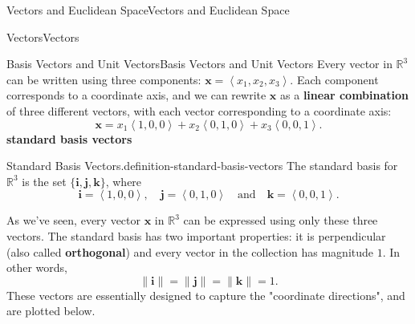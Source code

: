 \documentclass[10pt,]{book}
\newcommand{\terminology}[1]{\textbf{#1}}
\numberwithin{equation}{section}
\newcommand{\RR}{\mathbb{R}}
\newcommand{\vv}[1]{\mathbf{#1}}
\newcommand{\dotprod}[1]{\left\langle #1 \right\rangle}
\begin{document}
\begin{chapterptx}{Vectors and Euclidean Space}{}{Vectors and Euclidean Space}{}{}
\begin{sectionptx}{Vectors}{}{Vectors}{}{}
\begin{subsectionptx}{Basis Vectors and Unit Vectors}{}{Basis Vectors and Unit Vectors}{}{}
\hypertarget{p-890}{}%
Every vector in \(\RR^{3}\) can be written using three components: \(\vv{x} = \dotprod{x_{1},x_{2},x_{3}}.\) Each component corresponds to a coordinate axis, and we can rewrite \(\vv{x}\) as a \terminology{linear combination} of three different vectors, with each vector corresponding to a coordinate axis:%
%
\begin{equation*}
\vv{x} = x_{1}\dotprod{1,0,0}+x_{2}\dotprod{0,1,0}+x_{3}\dotprod{0,0,1}.
\end{equation*}
\terminology{standard basis vectors}\begin{definition}{Standard Basis Vectors.}{definition-standard-basis-vectors}%
\hypertarget{p-891}{}%
The standard basis for \(\RR^{3}\) is the set \(\{\vv{i},\vv{j},\vv{k}\}\), where%
%
\begin{equation*}
\vv{i} = \dotprod{1,0,0},\quad\vv{j} = \dotprod{0,1,0}\quad\text{and}\quad\vv{k} = \dotprod{0,0,1}.
\end{equation*}
\end{definition}
\hypertarget{p-892}{}%
As we've seen, every vector \(\vv{x}\) in \(\RR^{3}\) can be expressed using only these three vectors. The standard basis has two important properties: it is perpendicular (also called \terminology{orthogonal}) and every vector in the collection has magnitude \(1\). In other words,%
%
\begin{equation*}
\|\vv{i}\| = \|\vv{j}\| = \|\vv{k}\| = 1.
\end{equation*}
\hypertarget{p-893}{}%
These vectors are essentially designed to capture the "coordinate directions", and are plotted below.%
\begin{figure}
\centering
{
}
\end{figure}
\end{subsectionptx}
\end{sectionptx}
\end{chapterptx}
\end{document}
